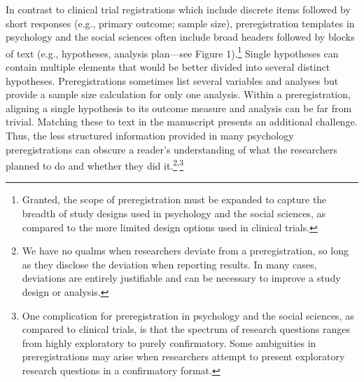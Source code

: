 \documentclass[authordate, meta, issue]{jote-new-article}
\begin{document}
In contrast to clinical trial registrations which include discrete items followed by short responses (e.g., primary outcome; sample size), preregistration templates in psychology and the social sciences often include broad headers followed by blocks of text (e.g., hypotheses, analysis plan—see Figure 1).\footnote{ Granted, the scope of preregistration must be expanded to capture the breadth of study designs used in psychology and the social sciences, as compared to the more limited design options used in clinical trials.} Single hypotheses can contain multiple elements that would be better divided into several distinct hypotheses. Preregistrations sometimes list several variables and analyses but provide a sample size calculation for only one analysis. Within a preregistration, aligning a single hypothesis to its outcome measure and analysis can be far from trivial. Matching these to text in the manuscript presents an additional challenge. Thus, the less structured information provided in many psychology preregistrations can obscure a reader’s understanding of what the researchers planned to do and whether they did it.\footnote{ We have no qualms when researchers deviate from a preregistration, so long as they disclose the deviation when reporting results. In many cases, deviations are entirely justifiable and can be necessary to improve a study design or analysis.}\textsuperscript{,}\footnote{ One complication for preregistration in psychology and the social sciences, as compared to clinical trials, is that the spectrum of research questions ranges from highly exploratory to purely confirmatory. Some ambiguities in preregistrations may arise when researchers attempt to present exploratory research questions in a confirmatory format.}
\end{document}
